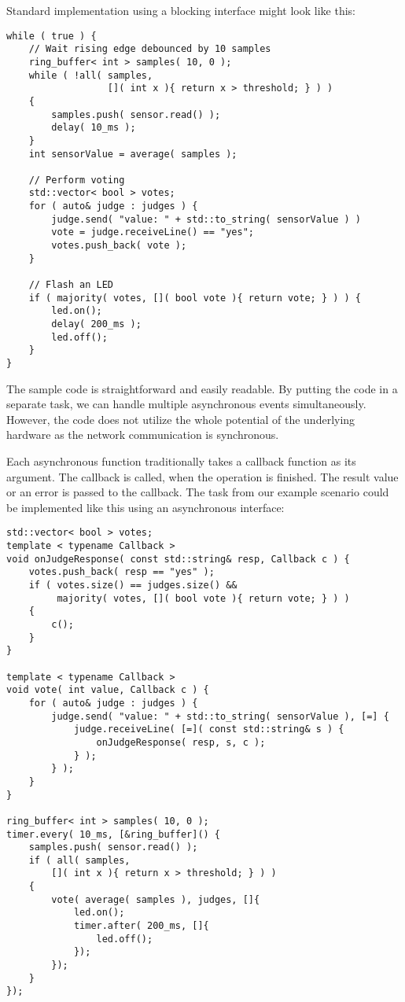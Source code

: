 Standard implementation using a blocking interface might look like this:
\begin{verbatim}
while ( true ) {
    // Wait rising edge debounced by 10 samples
    ring_buffer< int > samples( 10, 0 );
    while ( !all( samples,
                  []( int x ){ return x > threshold; } ) )
    {
        samples.push( sensor.read() );
        delay( 10_ms );
    }
    int sensorValue = average( samples );

    // Perform voting
    std::vector< bool > votes;
    for ( auto& judge : judges ) {
        judge.send( "value: " + std::to_string( sensorValue ) )
        vote = judge.receiveLine() == "yes";
        votes.push_back( vote );
    }

    // Flash an LED
    if ( majority( votes, []( bool vote ){ return vote; } ) ) {
        led.on();
        delay( 200_ms );
        led.off();
    }
}
\end{verbatim}

The sample code is straightforward and easily readable. By putting the code in a
separate task, we can handle multiple asynchronous events simultaneously.
However, the code does not utilize the whole potential of the underlying
hardware as the network communication is synchronous.

Each asynchronous function traditionally takes a callback function as its
argument. The callback is called, when the operation is finished. The result
value or an error is passed to the callback. The task from our example scenario
could be implemented like this using an asynchronous interface:

\begin{verbatim}
std::vector< bool > votes;
template < typename Callback >
void onJudgeResponse( const std::string& resp, Callback c ) {
    votes.push_back( resp == "yes" );
    if ( votes.size() == judges.size() &&
         majority( votes, []( bool vote ){ return vote; } ) )
    {
        c();
    }
}

template < typename Callback >
void vote( int value, Callback c ) {
    for ( auto& judge : judges ) {
        judge.send( "value: " + std::to_string( sensorValue ), [=] {
            judge.receiveLine( [=]( const std::string& s ) {
                onJudgeResponse( resp, s, c );
            } );
        } );
    }
}

ring_buffer< int > samples( 10, 0 );
timer.every( 10_ms, [&ring_buffer]() {
    samples.push( sensor.read() );
    if ( all( samples,
        []( int x ){ return x > threshold; } ) )
    {
        vote( average( samples ), judges, []{
            led.on();
            timer.after( 200_ms, []{
                led.off();
            });
        });
    }
});
\end{verbatim}

